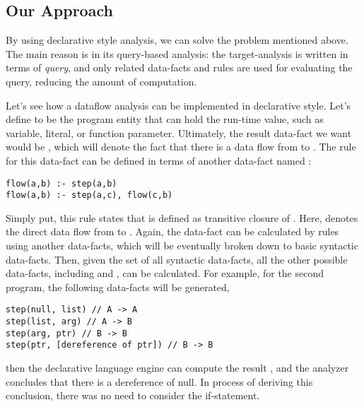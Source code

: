 \subsection{Our Approach}

By using declarative style analysis, we can solve the problem mentioned above.
The main reason is in its query-based analysis: the target-analysis is
written in terms of \textit{query}, and only related data-facts and rules
are used for evaluating the query, reducing the amount of computation.

Let's see how a dataflow analysis can be implemented in declarative style.
Let's define  to be the program entity that can hold the run-time
value, such as variable, literal, or function parameter.  Ultimately, the
result data-fact we want would be , which will denote the
fact that there is a data flow from  to . The
rule for this data-fact can be defined in terms of another data-fact named
:

\begin{lstlisting}[style=myDatalog,xleftmargin=2.5em]
flow(a,b) :- step(a,b)
flow(a,b) :- step(a,c), flow(c,b)
\end{lstlisting}

Simply put, this rule states that  is defined as transitive
closure of .  Here,  denotes the direct data
flow from  to . Again, the data-fact
 can be calculated by rules using another data-facts, which will
be eventually broken down to basic syntactic data-facts.  Then, given the set
of all syntactic data-facts, all the other possible data-facts, including
 and , can be calculated. For example, for the
second program, the following data-facts will be generated,

\begin{lstlisting}[style=myDatalog,xleftmargin=2.5em]
step(null, list) // A -> A
step(list, arg) // A -> B
step(arg, ptr) // B -> B
step(ptr, [dereference of ptr]) // B -> B
\end{lstlisting}

then the declarative language engine can compute the result , and the analyzer concludes that there is a dereference
of null. In process of deriving this conclusion, there was no need to consider
the if-statement.


